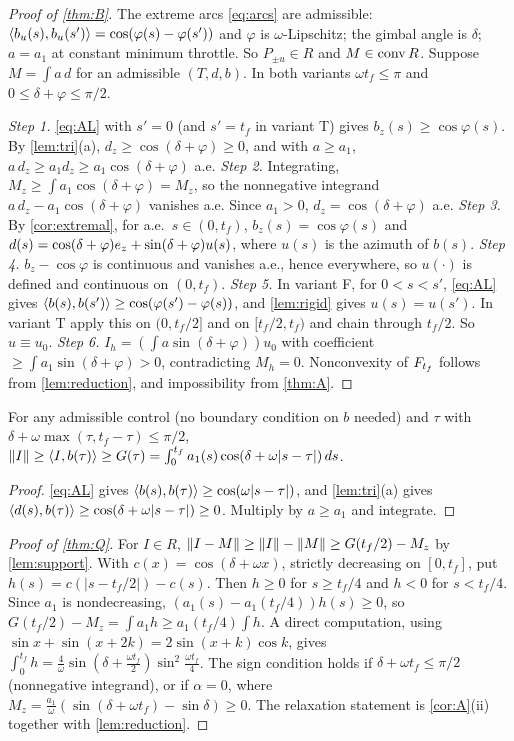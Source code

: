 \begin{proof}[Proof of \cref{thm:B}]
The extreme arcs \eqref{eq:arcs} are admissible: $\langle b_u(s),b_u(s')\rangle=\cos(\varphi(s)-\varphi(s'))$ and $\varphi$ is $\omega$-Lipschitz; the
gimbal angle is $\delta$; $a=a_1$ at constant minimum throttle. So $P_{\pm u}\in R$ and $M\in\operatorname{conv} R$. Suppose $M=\int a\,d$ for an
admissible $(T,d,b)$. In both variants $\omega t_f\le\pi$ and $0\le\delta+\varphi\le\pi/2$.

\emph{Step 1.} \eqref{eq:AL} with $s'=0$ (and $s'=t_f$ in variant T) gives $b_z(s)\ge\cos\varphi(s)$. By \cref{lem:tri}(a),
$d_z\ge\cos(\delta+\varphi)\ge0$, and with $a\ge a_1$, $a\,d_z\ge a_1d_z\ge a_1\cos(\delta+\varphi)$ a.e.
\emph{Step 2.} Integrating, $M_z\ge\int a_1\cos(\delta+\varphi)=M_z$, so the nonnegative integrand $a\,d_z-a_1\cos(\delta+\varphi)$ vanishes a.e.
Since $a_1>0$, $d_z=\cos(\delta+\varphi)$ a.e.
\emph{Step 3.} By \cref{cor:extremal}, for a.e.\ $s\in(0,t_f)$, $b_z(s)=\cos\varphi(s)$ and
$d(s)=\cos(\delta+\varphi)e_z+\sin(\delta+\varphi)u(s)$, where $u(s)$ is the azimuth of $b(s)$.
\emph{Step 4.} $b_z-\cos\varphi$ is continuous and vanishes a.e., hence everywhere, so $u(\cdot)$ is defined and continuous on $(0,t_f)$.
\emph{Step 5.} In variant F, for $0<s<s'$, \eqref{eq:AL} gives $\langle b(s),b(s')\rangle\ge\cos(\varphi(s')-\varphi(s))$, and \cref{lem:rigid} gives
$u(s)=u(s')$. In variant T apply this on $(0,t_f/2]$ and on $[t_f/2,t_f)$ and chain through $t_f/2$. So $u\equiv u_0$.
\emph{Step 6.} $I_h=(\int a\sin(\delta+\varphi))u_0$ with coefficient $\ge\int a_1\sin(\delta+\varphi)>0$, contradicting $M_h=0$.
Nonconvexity of $F_{t_f}$ follows from \cref{lem:reduction}, and impossibility from \cref{thm:A}.
\end{proof}

\begin{lemma}\label{lem:support}
For any admissible control (no boundary condition on $b$ needed) and $\tau$ with $\delta+\omega\max(\tau,t_f-\tau)\le\pi/2$,
$\lVert I\rVert\ge\langle I,b(\tau)\rangle\ge G(\tau)=\int_0^{t_f}a_1(s)\cos(\delta+\omega|s-\tau|)\,ds$.
\end{lemma}
\begin{proof}
\eqref{eq:AL} gives $\langle b(s),b(\tau)\rangle\ge\cos(\omega|s-\tau|)$, and \cref{lem:tri}(a) gives $\langle d(s),b(\tau)\rangle\ge\cos(\delta+\omega|s-\tau|)\ge0$.
Multiply by $a\ge a_1$ and integrate.
\end{proof}

\begin{proof}[Proof of \cref{thm:Q}]
For $I\in R$, $\lVert I-M\rVert\ge\lVert I\rVert-\lVert M\rVert\ge G(t_f/2)-M_z$ by \cref{lem:support}. With $c(x)=\cos(\delta+\omega x)$, strictly decreasing on
$[0,t_f]$, put $h(s)=c(|s-t_f/2|)-c(s)$. Then $h\ge0$ for $s\ge t_f/4$ and $h<0$ for $s<t_f/4$. Since $a_1$ is nondecreasing,
$(a_1(s)-a_1(t_f/4))h(s)\ge0$, so $G(t_f/2)-M_z=\int a_1h\ge a_1(t_f/4)\int h$. A direct computation, using
$\sin x+\sin(x+2k)=2\sin(x+k)\cos k$, gives
$\int_0^{t_f}h=\frac4\omega\sin(\delta+\frac{\omega t_f}2)\sin^2\frac{\omega t_f}4$. The sign condition holds if $\delta+\omega t_f\le\pi/2$
(nonnegative integrand), or if $\alpha=0$, where $M_z=\frac{a_1}\omega(\sin(\delta+\omega t_f)-\sin\delta)\ge0$. The relaxation statement is
\cref{cor:A}(ii) together with \cref{lem:reduction}.
\end{proof}
